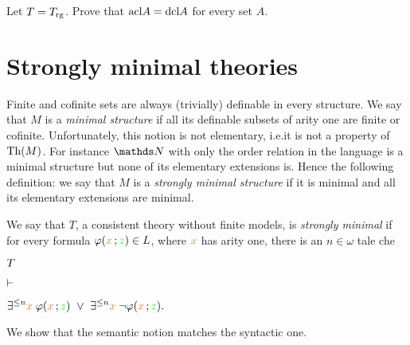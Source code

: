 \begin{exercise}
  Let $T=T_{\rm rg}$. Prove that ${\rm acl} A={\rm dcl} A$ for every set $A$.
\end{exercise} 


\section{Strongly minimal theories\label{tfm}}%
 
\def\medrel#1{\parbox[t]{5ex}{$\displaystyle\hfil #1$}}
\def\ceq#1#2#3{\parbox{15ex}{$\displaystyle #1$}\medrel{#2}$\displaystyle  #3$}

Finite and cofinite sets are always (trivially) definable in every structure.
We say that $M$ is a \emph{minimal structure\/} if all its definable subsets of arity one are finite or cofinite.
Unfortunately, this notion is not elementary, i.e.\@ it is not a property of ${\rm Th}(M)$.
For instance $\NN$ with only the order relation in the language is a minimal structure but 
none of its elementary extensions is.
Hence the following definition: 
we say that $M$ is a \emph{strongly minimal structure\/} if it is minimal and all its elementary extensions are minimal.

We say that $T$, a consistent theory without finite models, is \emph{strongly minimal\/} if 
for every formula $\varphi({\color{brown} x}\,;{\color{green} z})\in L$, where ${\color{brown} x}$ has arity one, there is an  $n\in\omega$ tale che

\ceq{\hfill T}
{\proves}
{\E^{\le n}{\mr x}\;\phi({\mr x}\,;{\gr z})\ \vee\ \E^{\le n}{\mr x}\;\neg\phi({\mr x}\,;{\gr z}).}

We show that the semantic notion matches the syntactic one.

